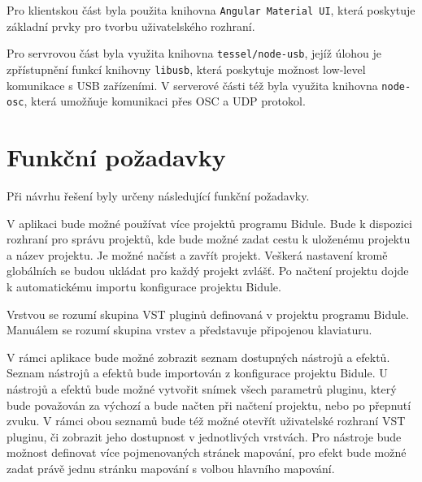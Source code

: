 \documentclass[thesis=M,czech]{FITthesis}[2019/03/06]
\begin{document}
		Pro klientskou část byla použita knihovna \texttt{Angular Material UI}, která poskytuje základní prvky pro tvorbu uživatelského rozhraní.

		Pro servrovou část byla využita knihovna \texttt{tessel/node-usb}, jejíž úlohou je zpřístupnění funkcí knihovny \texttt{libusb}\cite{libusb}, která poskytuje možnost low-level komunikace s USB zařízeními.
		V serverové části též byla využita knihovna \texttt{node-osc}, která umožňuje komunikaci přes OSC a UDP protokol.
		
	\section{Funkční požadavky}
		Při návrhu řešení byly určeny následující funkční požadavky.
	
		V aplikaci bude možné používat více projektů programu Bidule. Bude k dispozici rozhraní pro správu projektů, kde bude možné
		zadat cestu k uloženému projektu a název projektu. Je možné načíst a zavřít projekt. Veškerá nastavení kromě globálních se budou ukládat 
		pro každý projekt zvlášť. Po načtení projektu dojde k automatickému importu konfigurace projektu Bidule.
		
		Vrstvou se rozumí skupina VST pluginů definovaná v projektu programu Bidule. Manuálem se rozumí skupina vrstev a představuje připojenou klaviaturu.

		V rámci aplikace bude možné zobrazit seznam dostupných nástrojů a efektů. Seznam nástrojů a efektů bude importován z konfigurace projektu Bidule.
		U nástrojů a efektů bude možné vytvořit snímek všech parametrů pluginu, který bude považován za výchozí a bude načten při načtení projektu, nebo po přepnutí zvuku. V rámci obou seznamů bude též možné otevřít uživatelské rozhraní VST pluginu, či zobrazit jeho dostupnost v jednotlivých vrstvách. Pro nástroje bude možnost definovat více pojmenovaných stránek mapování, pro efekt bude možné zadat právě jednu stránku mapování s volbou hlavního mapování.
\end{document}
